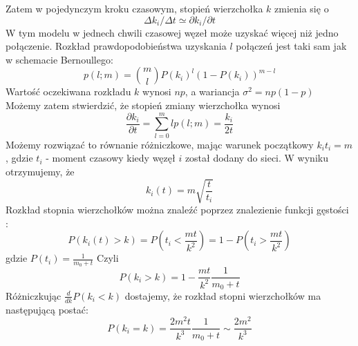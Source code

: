 \documentclass{article}
\begin{document}
	Zatem w pojedynczym kroku czasowym, stopień wierzchołka $k$ zmienia się o
	\begin{equation}
	\Delta k_i/\Delta t \simeq \partial k_i / \partial t
	\end{equation}
		W tym modelu w jednech chwili czasowej węzeł może uzyskać więcej niż jedno połączenie. Rozkład prawdopodobieństwa uzyskania $l$ połączeń jest taki sam jak w schemacie Bernoullego:
		\begin{equation}
		p(l;m) = \binom{m}{l}P(k_i)^l(1 - P(k_i))^{m -l}
		\end{equation}
	Wartość oczekiwana rozkładu $k$ wynosi $np$, a wariancja $\sigma^2 = np(1 - p)$\\ Możemy zatem stwierdzić, że stopień zmiany wierzchołka wynosi
	\begin{equation}
		\frac{\partial k_i}{\partial t} = \sum_{l = 0}^m lp(l; m) = \frac{k_i} {2t}
	\end{equation}
	Możemy rozwiązać to równanie różniczkowe, mając warunek początkowy $k_i{t_i} = m$, gdzie $t_i$ - moment czasowy kiedy węzęł $i$ został dodany do sieci. W wyniku otrzymujemy, że 
	\begin{equation}
		k_i(t) = m \sqrt{\frac{t}{t_i}}
	\end{equation}
	Rozkład stopnia wierzchołków można znaleźć poprzez znalezienie funkcji gęstości :
	\begin{equation}
		P(k_i(t) > k) = P(t_i < \frac{mt}{k^2}) = 1 - P(t_i > \frac{mt}{k^2})
	\end{equation}
	gdzie $P(t_i) = \frac{1}{m_0 + t}$ Czyli 
	\begin{equation}
		P(k_i > k) = 1 - \frac{mt}{k^2}\frac{1}{m_0 + t}
	\end{equation}
	Różniczkując $\frac{d}{dk}P(k_i < k)$ dostajemy, że rozkład stopni wierzchołków ma następującą postać:
	\begin{equation}
	P(k_i = k) = \frac{2m^2t}{k^3}\frac{1}{m_0 + t} \sim \frac{2m^2}{k^3}
	\end{equation}
\end{document}
